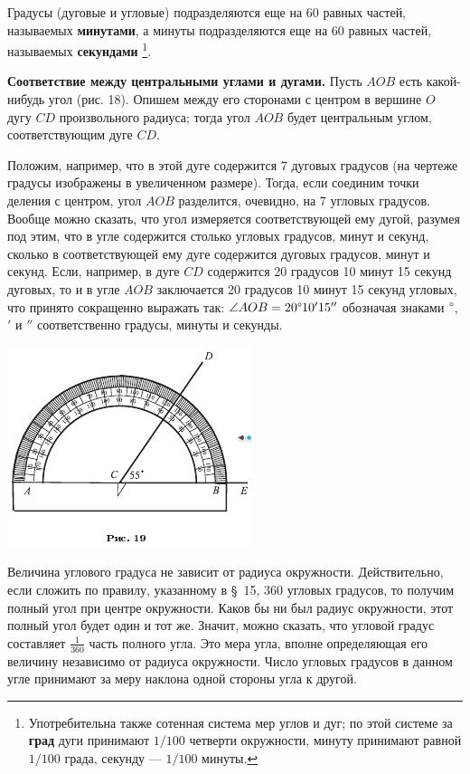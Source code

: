 \documentclass[oneside]{book}
\begin{document}
Градусы (дуговые и угловые) подразделяются еще на 60 равных частей, называемых \textbf{минутами}, а минуты подразделяются еще на 60 равных частей, называемых \textbf{секундами}%
\footnote{Употребительна также сотенная система мер углов и дуг;
по этой системе за \textbf{град} дуги принимают $1/100$ четверти окружности, минуту принимают равной $1/100$ града, секунду — $1/100$ минуты.}.


\textbf{Соответствие между центральными углами и дугами.}
Пусть $AOB$ есть какой-нибудь угол (рис. 18).
Опишем между его сторонами с центром в вершине $O$ дугу $CD$ произвольного радиуса;
тогда угол $AOB$ будет центральным углом, соответствующим дуге $CD$.

Положим, например, что в этой дуге содержится 7 дуговых градусов (на чертеже градусы изображены в увеличенном размере).
Тогда, если соединим точки деления с центром, угол $AOB$ разделится, очевидно, на 7 угловых градусов.
Вообще можно сказать, что угол измеряется соответствующей ему дугой, разумея под этим, что в угле содержится столько угловых градусов, минут и секунд, сколько в соответствующей ему дуге содержится дуговых градусов, минут и секунд.
Если, например, в дуге $CD$ содержится 20 градусов 10 минут 15 секунд дуговых, то и в угле $AOB$ заключается 20 градусов 10 минут 15 секунд угловых, что принято сокращенно выражать так:
$\angle AOB = 20\degree 10'15''$ обозначая знаками $\degree $, $'$ и $''$ соответственно градусы, минуты и секунды.

\includegraphics{pics/ris-19}

Величина углового градуса не зависит от радиуса окружности.
Действительно, если сложить по правилу, указанному в §~15, 360 угловых градусов, то получим полный угол при центре окружности.
Каков бы ни был радиус окружности, этот полный угол будет один и тот же.
Значит, можно сказать, что угловой градус составляет $\tfrac1{360}$ часть полного угла.
Это мера угла, вполне определяющая его величину независимо от радиуса окружности.
Число угловых градусов в данном угле принимают за меру наклона одной стороны угла к другой.
\end{document}
